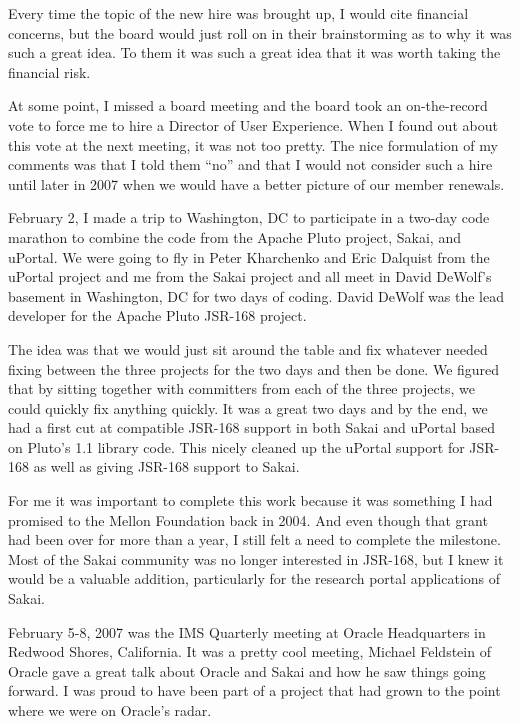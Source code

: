 \documentclass[12pt]{book}
\begin{document}
Every time the topic of the new hire was brought up, I would cite financial
concerns, but the board would just roll on in their brainstorming as to why it
was such a great idea.  To them it was such a great idea that it was worth
taking the financial risk.

At some point, I missed a board meeting and the board took an on-the-record vote
to force me to hire a Director of User Experience.   When I found out about this
vote at the next meeting, it was not too pretty.   The nice formulation
of my comments was that I told them ``no'' and that I would not consider such a hire
until later in 2007 when we would have a better picture of our member renewals.


February 2, I made a trip to Washington, DC to participate in a two-day code marathon
to combine the code from the Apache Pluto project, Sakai, and uPortal.   We were
going to fly in Peter Kharchenko and Eric Dalquist from the uPortal project and me from
the Sakai project and all meet in David DeWolf's basement in Washington, DC
for two days of coding.
David DeWolf was the lead developer for the Apache Pluto JSR-168 project.

The idea was that we would just sit around the table and fix whatever needed
fixing between the three projects for the two days and then be done.
We figured that by sitting together with committers from each of the three projects,
we could quickly fix anything quickly.
It was a great two days and by the end, we had a first cut
at compatible JSR-168 support in both
Sakai and uPortal based on Pluto's 1.1 library code.  This nicely cleaned up the
uPortal support for JSR-168 as well as giving JSR-168 support to Sakai.

For me it was important to complete this work because it was something I had promised
to the Mellon Foundation back in 2004.  And even though that grant had been over for
more than a year, I still felt a need to complete the milestone.  Most of the Sakai
community was no longer interested in JSR-168, but I knew it would be a valuable
addition, particularly for the research portal applications of Sakai.

February 5-8, 2007 was the IMS Quarterly meeting at Oracle Headquarters in Redwood
Shores, California.   It was a pretty cool meeting, Michael Feldstein of Oracle gave
a great talk about Oracle and Sakai and how he saw things going forward.   I was
proud to have been part of a project that had grown to the point where we were
on Oracle's radar.
\end{document}
